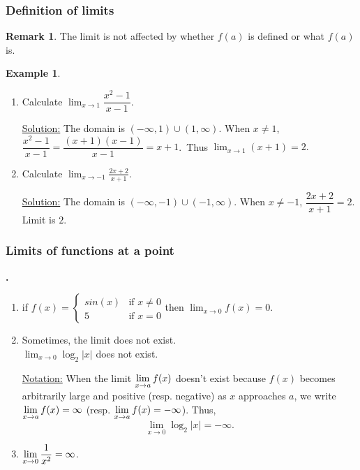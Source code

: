 \documentclass[t]{beamer}
\theoremstyle{plain}
\theoremstyle{definition}
\newtheorem{rem}[prop]{Remark}
\newtheorem{ex}{Example}[section]
\newcommand{\nin}{\noindent}
\newcommand{\ds}{\displaystyle}
\newcommand{\disp}{\displaystyle}
\newcounter{heading}
\newcommand{\newhead}[1]{\medskip\stepcounter{heading}\noindent\textbf{\hspace{0.2cm}{#1}.}}
\newcommand{\limm}[1]{\displaystyle \lim_{x\to #1}}
\begin{document}
\frame
{
	\frametitle{Definition of  limits}
	\begin{rem}
	The limit is not affected by whether $f(a)$ is defined or what $f(a)$ is.
	\end{rem}
	\pause
	\begin{ex}
\begin{enumerate}
\item Calculate $\disp{\lim_{x\to 1}} {\dfrac{x^2-1}{x-1}}$.\pause

\nin\underline{Solution:} The domain is $(-\infty, 1)\cup (1, \infty)$. When
$x\neq 1$, ${\dfrac{x^2-1}{x-1}=\dfrac{(x+1)(x-1)}{x-1}}= x+1$.\ \pause Thus 
$\disp{
\lim_{x\to 1} (x+1) = 2.}$\pause
\item Calculate $\ds{\lim_{x\to -1}} \ds{\frac{2x+2}{x+1}}$.\pause

\nin\underline{Solution:} The domain is $(-\infty, -1)\cup (-1, \infty)$. When
$x\neq -1$, ${\dfrac{2x+2}{x+1}}= 2$. \pause 
Limit is $2$.
\end{enumerate}
\end{ex}
}

\begin{frame}
\frametitle{Limits of functions at a point}
\newhead{Examples}
\begin{enumerate}[<+->]
\addtocounter{enumi}{2}
\item if $f(x)=\begin{cases}
sin(x)&\mbox{if }x\neq 0\\
5&\mbox{if }x=0
      \end{cases}$\qquad then $\limm{0}f(x) = 0.$
\item Sometimes, the limit does not exist.\\
$\limm{0}\log_2|x|$ does not exist.

\noindent \underline{Notation:} When the limit $\ds\limm{a}f(x)$ doesn't exist because $f(x)$ becomes arbitrarily large and positive (resp. negative) as $x$ approaches $a$, we write $\ds\limm{a}f(x)=\infty$ (resp. $\ds\limm{a}f(x)=-\infty$). Thus,
\[\limm{0}\log_2|x|=-\infty.\]
\item $\ds\limm{0}\dfrac{1}{x^2}=\infty$.
\end{enumerate}

\end{frame}
\end{document}
